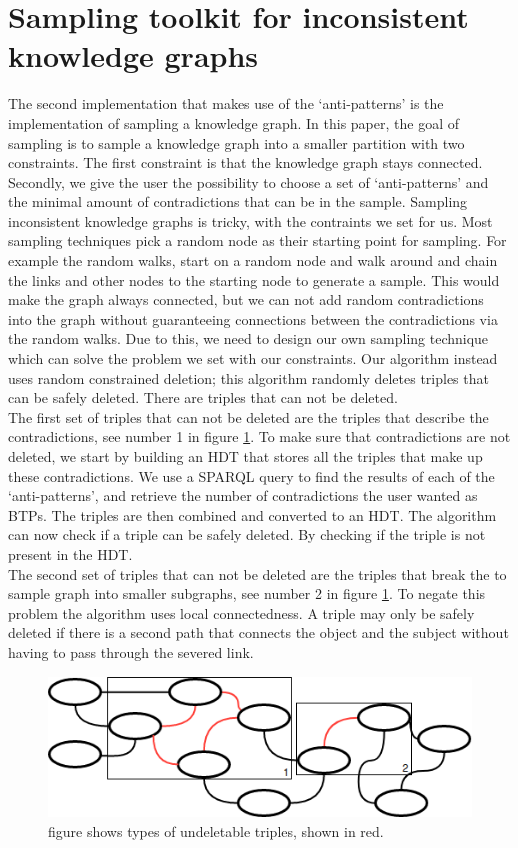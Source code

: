 \documentclass[11pt,letterpaper ,oneside ]{book}
\begin{document}
	\section{Sampling toolkit for inconsistent knowledge graphs}
	The second implementation that makes use of the `anti-patterns' is the implementation of sampling a knowledge graph. In this paper, the goal of sampling is to sample a knowledge graph into a smaller partition with two constraints. The first constraint is that the knowledge graph stays connected. Secondly, we give the user the possibility to choose a set of `anti-patterns' and the minimal amount of contradictions that can be in the sample.
	Sampling inconsistent knowledge graphs is tricky, with the contraints we set for us. Most sampling techniques pick a random node as their starting point for sampling. For example the random walks, start on a random node and walk around and chain the links and other nodes to the starting node to generate a sample. This would make the graph always connected, but we can not add random contradictions into the graph without guaranteeing connections between the contradictions via the random walks. Due to this, we need to design our own sampling technique which can solve the problem we set with our constraints.
	Our algorithm instead uses random constrained deletion; this algorithm randomly deletes triples that can be safely deleted. There are triples that can not be deleted.\\
	The first set of triples that can not be deleted are the triples that describe the contradictions, see number 1 in figure \ref{fig:sampling}. To make sure that contradictions are not deleted, we start by building an HDT\cite{FMPGPA:13}\cite{MPAF:12} that stores all the triples that make up these contradictions. We use a SPARQL query to find the results of each of the `anti-patterns', and retrieve the number of contradictions the user wanted as BTPs. The triples are then combined and converted to an HDT. The algorithm can now check if a triple can be safely deleted. By checking if the triple is not present in the HDT.\\
	The second set of triples that can not be deleted are the triples that break the to sample graph into smaller subgraphs, see number 2 in figure \ref{fig:sampling}. To negate this problem the algorithm uses local connectedness. A triple may only be safely deleted if there is a second path that connects the object and the subject without having to pass through the severed link.
	\begin{figure}
	\centering
	\includegraphics[width=\linewidth]{images/Sampling.png}
	\caption{figure shows types of undeletable triples, shown in red.}
	\label{fig:sampling}
\end{figure}
\end{document}
